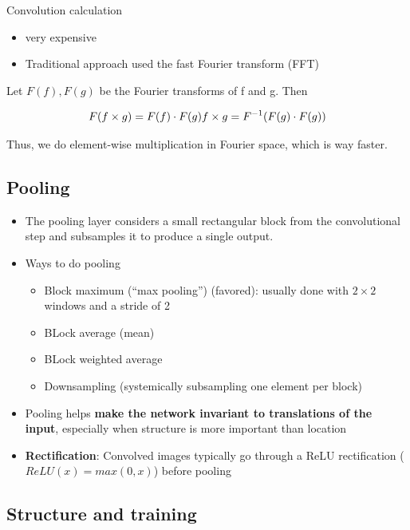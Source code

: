 \documentclass[
]{book}
\begin{document}
Convolution calculation

\begin{itemize}
\item
  very expensive
\item
  Traditional approach used the fast Fourier transform (FFT)
\end{itemize}

Let \(F(f), F(g)\) be the Fourier transforms of f and g. Then

\[
F(f \times g) = F(f)\cdot F(g) \\
f \times g = F^{-1}(F(g) \cdot F(g))
\]

Thus, we do element-wise multiplication in Fourier space, which is way faster.

\hypertarget{pooling}{%
\subsection{Pooling}\label{pooling}}

\begin{itemize}
\item
  The pooling layer considers a small rectangular block from the convolutional step and subsamples it to produce a single output.
\item
  Ways to do pooling

  \begin{itemize}
  \item
    Block maximum (``max pooling'') (favored): usually done with \(2 \times 2\) windows and a stride of 2
  \item
    BLock average (mean)
  \item
    BLock weighted average
  \item
    Downsampling (systemically subsampling one element per block)
  \end{itemize}
\item
  Pooling helps \textbf{make the network invariant to translations of the input}, especially when structure is more important than location
\item
  \textbf{Rectification}: Convolved images typically go through a ReLU rectification (\(ReLU(x) = max(0,x)\)) before pooling
\end{itemize}

\hypertarget{structure-and-training}{%
\subsection{Structure and training}\label{structure-and-training}}
\end{document}
